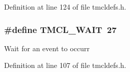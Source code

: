 Definition at line 124 of file tmcldefs.h.\hypertarget{group__TMCLComm_ga3c134dcd5083b786adf60d3240cdee87}{
\subsubsection[{TMCL\_\-WAIT}]{\setlength{\rightskip}{0pt plus 5cm}\#define TMCL\_\-WAIT~27}}
\label{group__TMCLComm_ga3c134dcd5083b786adf60d3240cdee87}
Wait for an event to occurr 

Definition at line 107 of file tmcldefs.h.